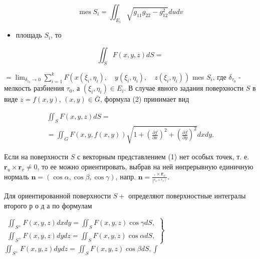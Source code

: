 \documentclass[10pt]{article}
\begin{document}
\[

\operatorname{mes} S_{i}=\iint_{E_{i}} \sqrt{g_{11} g_{22}-g_{12}^{2}} d u d v

\]



\begin{itemize}

  \item площадь $S_{i}$, то

\end{itemize}



\[

\iint_{S} F(x, y, z) d S=

\]



$=\lim _{\delta_{\tau_{0}} \rightarrow 0} \sum_{i=1}^{k} F\left(x\left(\xi_{i}, \eta_{i}\right), \quad y\left(\xi_{i}, \eta_{i}\right), \quad z\left(\xi_{i}, \eta_{i}\right)\right)$ mes $S_{i}$, где $\delta_{\tau_{0}}$ - мелкость разбиения $\tau_{0}$, а $\left(\xi_{i}, \eta_{i}\right) \in E_{i}$. В случае явного задания поверхности $S$ в виде $z=f(x, y)$, $(x, y) \in \bar{G}$, формула (2) принимает вид



\[

\begin{gathered}

\iint_{S} F(x, y, z) d S= \\

=\iint_{G} F(x, y, f(x, y)) \sqrt{1+\left(\frac{\partial f}{\partial x}\right)^{2}+\left(\frac{\partial f}{\partial y}\right)^{2}} d x d y .

\end{gathered}

\]



Если на поверхности $S$ с векторным представлением (1) нет особых точек, т. е. $\boldsymbol{r}_{u} \times \boldsymbol{r}_{v} \neq 0$, то ее можно ориентировать, выбрав на ней нөпрерывную единичную нормаль $\boldsymbol{n}=(\cos \alpha, \cos \beta, \cos \gamma)$, напр. $\boldsymbol{n}=\frac{{ }_{{ }^{r}} \times \boldsymbol{r}_{v}}{\mid{ }^{r_{a} \times r_{v} \mid}}$.



Для ориентированной поверхности $S+$ определяют поверхностные интегралы второго р о д а по формулам



$\left.\begin{array}{l}\iint_{S^{+}} F(x, y, z) d x d y=\iint_{S} F(x, y, z) \cos \gamma d S, \\ \iint_{S^{+}} F(x, y, z) d y d z=\iint_{S} F(x, y, z) \cos \alpha d S,\end{array}\right\}$ $\iint_{S^{+}} F(x, y, z) d y d z=\iint_{S} F(x, y, z) \cos \beta d S, \int$
\end{document}
